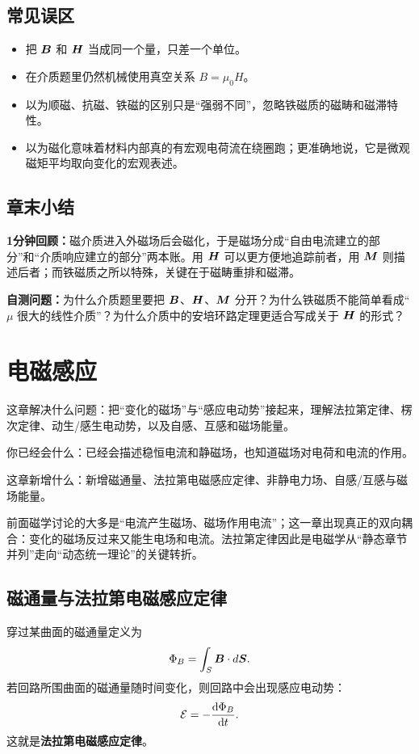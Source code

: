 \documentclass[lang=cn,11pt]{elegantbook}
\newcommand{\bridge}[1]{\begin{note}#1\end{note}}
\newcommand{\chapterroadmap}[3]{%
\begin{introduction}
  \item {\heiti 这章解决什么问题：}#1
  \item {\heiti 你已经会什么：}#2
  \item {\heiti 这章新增什么：}#3
\end{introduction}}
\newcommand{\summaryline}[1]{\par\noindent\textbf{1分钟回顾：}#1\par}
\newcommand{\chapterselfcheck}[1]{\par\noindent\textbf{自测问题：}#1\par}
\begin{document}
\section{常见误区}

\begin{itemize}
  \item 把 \(\vb*{B}\) 和 \(\vb*{H}\) 当成同一个量，只差一个单位。
  \item 在介质题里仍然机械使用真空关系 \(B=\mu_0H\)。
  \item 以为顺磁、抗磁、铁磁的区别只是“强弱不同”，忽略铁磁质的磁畴和磁滞特性。
  \item 以为磁化意味着材料内部真的有宏观电荷流在绕圈跑；更准确地说，它是微观磁矩平均取向变化的宏观表述。
\end{itemize}

\section{章末小结}

\summaryline{磁介质进入外磁场后会磁化，于是磁场分成“自由电流建立的部分”和“介质响应建立的部分”两本账。用 \(\vb*{H}\) 可以更方便地追踪前者，用 \(\vb*{M}\) 则描述后者；而铁磁质之所以特殊，关键在于磁畴重排和磁滞。}
\chapterselfcheck{为什么介质题里要把 \(\vb*{B}\)、\(\vb*{H}\)、\(\vb*{M}\) 分开？为什么铁磁质不能简单看成“\(\mu\) 很大的线性介质”？为什么介质中的安培环路定理更适合写成关于 \(\vb*{H}\) 的形式？}

\chapter{电磁感应}

\chapterroadmap
{把“变化的磁场”与“感应电动势”接起来，理解法拉第定律、楞次定律、动生/感生电动势，以及自感、互感和磁场能量。}
{已经会描述稳恒电流和静磁场，也知道磁场对电荷和电流的作用。}
{新增磁通量、法拉第电磁感应定律、非静电力场、自感/互感与磁场能量。}

\bridge{前面磁学讨论的大多是“电流产生磁场、磁场作用电流”；这一章出现真正的双向耦合：变化的磁场反过来又能生电场和电流。法拉第定律因此是电磁学从“静态章节并列”走向“动态统一理论”的关键转折。}

\section{磁通量与法拉第电磁感应定律}

穿过某曲面的磁通量定义为
\[
\Phi_B=\int_S \vb*{B}\cdot d\vb*{S}.
\]
若回路所围曲面的磁通量随时间变化，则回路中会出现感应电动势：
\[
\mathcal{E}=-\dv{\Phi_B}{t}.
\]
这就是\textbf{法拉第电磁感应定律}。
\end{document}
